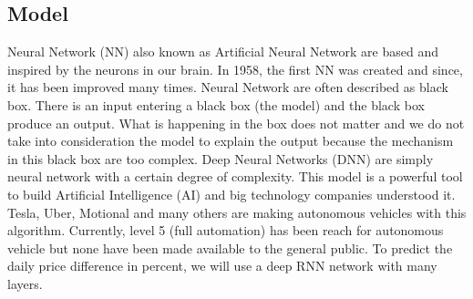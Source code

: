 \documentclass[conference]{IEEEtran}
\begin{document}
\subsection{Model}\label{AA}
Neural Network (NN) also known as Artificial Neural Network are based and inspired by the neurons in our brain. In 1958, the first NN was created and since, it has been improved many times. Neural Network are often described as black box. There is an input entering a black box (the model) and the black box produce an output. What is happening in the box does not matter and we do not take into consideration the model to explain the output because the mechanism in this black box are too complex. Deep Neural Networks (DNN) are simply neural network with a certain degree of complexity. This model is a powerful tool to build Artificial Intelligence (AI) and big technology companies understood it. Tesla, Uber, Motional and many others are making autonomous vehicles with this algorithm. Currently, level 5 (full automation) has been reach for autonomous vehicle but none have been made available to the general public. \newline
\newline
To predict the daily price difference in percent, we will use a deep RNN network with many layers. 
\end{document}

